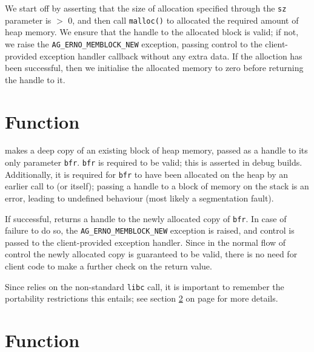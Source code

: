 We start off by asserting that the size of allocation specified through the
\verb|sz| parameter is $>$ 0, and then call \verb|malloc()| to allocated the
required amount of heap memory. We ensure that the handle to the allocated block
is valid; if not, we raise the \verb|AG_ERNO_MEMBLOCK_NEW| exception, passing
control to the client-provided exception handler callback without any extra
data. If the alloction has been successful, then we initialise the allocated
memory to zero before returning the handle to it.


%
%
\section{Function \agMemblockCopy}

\agMemblockCopy makes a deep copy of an existing block of heap memory, passed as
a handle to its only parameter \verb|bfr|. \verb|bfr| is required to be valid;
this is asserted in debug builds. Additionally, it is required for \verb|bfr| to
have been allocated on the heap by an earlier call to \agMemblockNew (or 
\agMemblockCopy itself); passing a handle to a block of memory on the stack is
an error, leading to undefined behaviour (most likely a segmentation fault).

If successful, \agMemblockCopy returns a handle to the newly allocated copy of
\verb|bfr|. In case of failure to do so, the \verb|AG_ERNO_MEMBLOCK_NEW|
exception is raised, and control is passed to the client-provided exception
handler. Since in the normal flow of control the newly allocated copy is
guaranteed to be valid, there is no need for client code to make a further
check on the return value.

Since \agMemblockCopy relies on the non-standard \verb|libc| call, it is 
important to remember the portability restrictions this entails; see section
\ref{sec:agMemblockSz} on page \pageref{sec:agMemblockSz} for more details.



%
%
\section{Function \agMemblockSz}
\label{sec:agMemblockSz}

